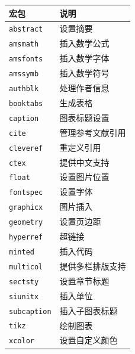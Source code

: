 \documentclass[a4paper]{article}
\begin{document}
\begin{center}
    \begin{tabular}{|m{}|m{}|}
        \hline
        宏包 & 说明 \\
        \hline
        \texttt{abstract} & 设置摘要 \\
        \texttt{amsmath} & 插入数学公式 \\
        \texttt{amsfonts} & 插入数学字体 \\
        \texttt{amssymb} & 插入数学符号 \\
        \texttt{authblk} & 处理作者信息 \\
        \texttt{booktabs} & 生成表格 \\
        \texttt{caption} & 图表标题设置 \\
        \texttt{cite} & 管理参考文献引用 \\
        \texttt{cleveref} & 重定义引用 \\
        \texttt{ctex} & 提供中文支持 \\
        \texttt{float} & 设置图片位置 \\
        \texttt{fontspec} & 设置字体 \\
        \texttt{graphicx} & 图片插入 \\
        \texttt{geometry} & 设置页边距 \\
        \texttt{hyperref} & 超链接 \\
        \texttt{minted} & 插入代码 \\
        \texttt{multicol} & 提供多栏排版支持 \\
        \texttt{sectsty} & 设置章节标题 \\
        \texttt{siunitx} & 插入单位 \\
        \texttt{subcaption} & 插入子图表标题 \\
        \texttt{tikz} & 绘制图表 \\
        \texttt{xcolor} & 设置自定义颜色 \\
        \hline
    \end{tabular}
\end{center}
\end{document}
